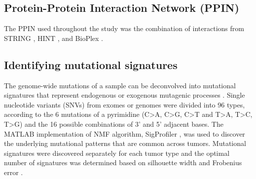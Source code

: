\documentclass[english, 10pt, letterpaper]{article}
\begin{document}
\subsection*{Protein-Protein Interaction Network (PPIN)}

The PPIN used throughout the study was the combination of interactions from STRING \cite{VonMering2005, Szklarczyk2019}, HINT \cite{Das2012}, and BioPlex \cite{Huttlin2015}.


\subsection*{Identifying mutational signatures}

The genome-wide mutations of a sample can be deconvolved into mutational signatures that represent endogenous or exogenous mutagenic processes \cite{Alexandrov2013}. 
Single nucleotide variants (SNVs) from exomes or genomes were divided into 96 types, according to the 6 mutations of a pyrimidine (C>A, C>G, C>T and T>A, T>C, T>G) and the 16 possible combinations of 3’ and 5’ adjacent bases.
The MATLAB \cite{MATLAB:2010} implementation of NMF algorithm, SigProfiler \cite{Alexandrov2013}, was used to discover the underlying mutational patterns that are common across tumors. 
Mutational signatures were discovered separately for each tumor type and the optimal number of signatures was determined based on silhouette width and Frobenius error \cite{Alexandrov2013DecipheringCancer.}.
\end{document}
